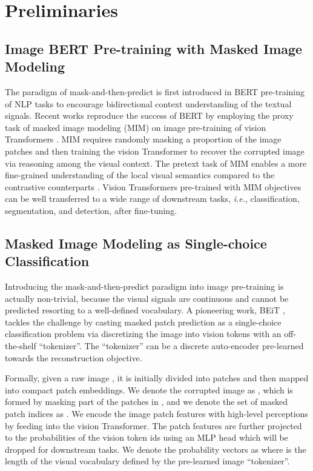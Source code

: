 \documentclass[runningheads]{llncs}
\begin{document}
\section{Preliminaries}

\subsection{Image BERT Pre-training with Masked Image Modeling}

The paradigm of mask-and-then-predict is first introduced in BERT pre-training \cite{BERT} of NLP tasks to encourage bidirectional context understanding of the textual signals. 
Recent works \cite{beit,ibot} reproduce the success of BERT by employing the proxy task of masked image modeling (MIM) on image pre-training of vision Transformers \cite{vit,deit,swinT}.
MIM requires randomly masking a proportion of the image patches and then training the vision Transformer to recover the corrupted image via reasoning among the visual context.
The pretext task of MIM enables a more fine-grained understanding of the local visual semantics compared to the contrastive counterparts \cite{simclr,moco}. 
Vision Transformers pre-trained with MIM objectives can be well transferred to a wide range of downstream tasks, \textit{i.e.}, classification, segmentation, and detection, after fine-tuning.









\subsection{Masked Image Modeling as Single-choice Classification}

Introducing the mask-and-then-predict paradigm into image pre-training is actually non-trivial, because 
the visual signals are continuous and cannot be predicted resorting to a well-defined vocabulary.
A pioneering work, BEiT \cite{beit}, tackles the challenge by casting masked patch prediction as a single-choice classification problem via discretizing the image into vision tokens with an off-the-shelf ``tokenizer''.
The ``tokenizer'' can be a discrete auto-encoder \cite{dalle,taming} pre-learned towards the reconstruction objective.





Formally, given a raw image , it is initially divided into  patches  and then mapped into compact patch embeddings.
We denote the corrupted image as , which is formed by masking part of the patches in , and we denote the set of masked patch indices as .
We encode the image patch features  with high-level perceptions by feeding  into the vision Transformer.
The patch features are further projected to the probabilities of the vision token ids using an MLP head which will be dropped for downstream tasks.
We denote the probability vectors as  where  is the length of the visual vocabulary defined by the pre-learned image ``tokenizer''.
\end{document}
